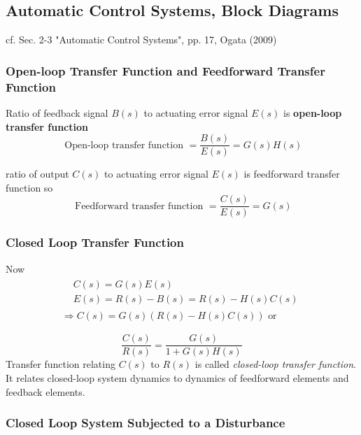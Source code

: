 \documentclass[10pt]{amsart}
\begin{document}
\begin{multicols*}{2}
\subsection{Automatic Control Systems, Block Diagrams}

cf. Sec. 2-3 "Automatic Control Systems", pp. 17, Ogata (2009) \cite{Ogat2009}

\subsubsection{Open-loop Transfer Function and Feedforward Transfer Function}

Ratio of feedback signal $B(s)$ to actuating error signal $E(s)$ is \textbf{open-loop transfer function}
\begin{equation}
\text{ Open-loop transfer function } = \frac{B(s)}{E(s)} = G(s)H(s)
\end{equation}

ratio of output $C(s)$ to actuating error signal $E(s)$ is feedforward transfer function so 
\begin{equation}
\text{ Feedforward transfer function } = \frac{C(s)}{E(s)} = G(s)
\end{equation}

\subsubsection{Closed Loop Transfer Function}

Now
\[
\begin{gathered}
	\begin{aligned}
& C(s) = G(s) E(s) \\
& E(s) = R(s) - B(s) = R(s) - H(s) C(s) 
\end{aligned} \\
\Longrightarrow C(s) = G(s) (R(s) - H(s) C(s)) \text{ or }
\end{gathered}
\]

\begin{equation}
 \frac{ C(s)}{R(s) } = \frac{G(s)}{ 1 + G(s) H(s)}
\end{equation}
Transfer function relating $C(s)$ to $R(s)$ is called \emph{closed-loop transfer function}. It relates closed-loop system dynamics to dynamics of feedforward elements and feedback elements.


\subsubsection{Closed Loop System Subjected to a Disturbance}


\end{multicols*}
\end{document}
